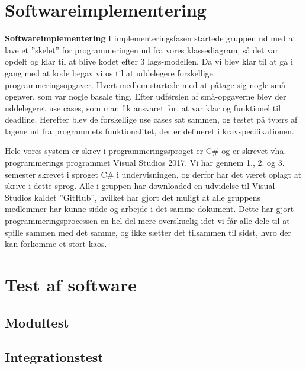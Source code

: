 \section{Softwareimplementering}
\textbf{Softwareimplementering}
I implementeringsfasen startede gruppen ud med at lave et ”skelet” for programmeringen ud fra vores klassediagram, så det var opdelt og klar til at blive kodet efter 3 lags-modellen. Da vi blev klar til at gå i gang med at kode begav vi os til at uddelegere forskellige programmeringsopgaver. Hvert medlem startede med at påtage sig nogle små opgaver, som var nogle basale ting. Efter udførslen af små-opgaverne blev der uddelegeret use cases, som man fik ansvaret for, at var klar og funktionel til deadline. Herefter blev de forskellige use cases sat sammen, og testet på tværs af lagene ud fra programmets funktionalitet, der er defineret i kravspecifikationen. 

Hele vores system er skrev i programmeringssproget er C# og er skrevet vha. programmerings programmet Visual Studios 2017.  Vi har gennem 1., 2. og 3. semester skrevet i sproget C# i undervisningen, og derfor har det været oplagt at skrive i dette sprog. Alle i gruppen har downloaded en udvidelse til Visual Studios kaldet ”GitHub”, hvilket har gjort det muligt at alle gruppens medlemmer har kunne sidde og arbejde i det samme dokument. Dette har gjort programmeringsprocessen en hel del mere overskuelig idet vi får alle dele til at spille sammen med det samme, og ikke sætter det tilsammen til sidst, hvro der kan forkomme et stort kaos. 
\section{Test af software}
\subsection{Modultest}
\subsection{Integrationstest}
